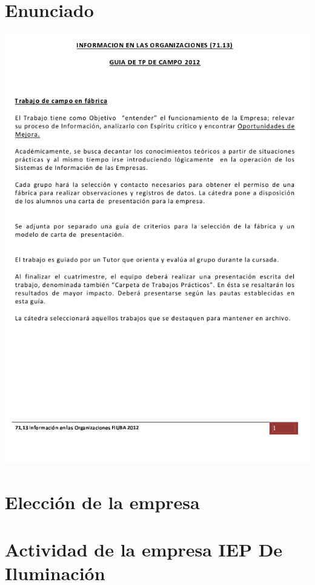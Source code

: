 \documentclass[12pt,titlepage]{report}
\begin{document}
\chapter*{Enunciado}
\begin{center}
 \includegraphics[keepaspectratio=true]{./Images/pagina1-guia.png}
\end{center}


\chapter{Elección de la empresa}


\chapter{Actividad de la empresa IEP De Iluminación}
\end{document}
